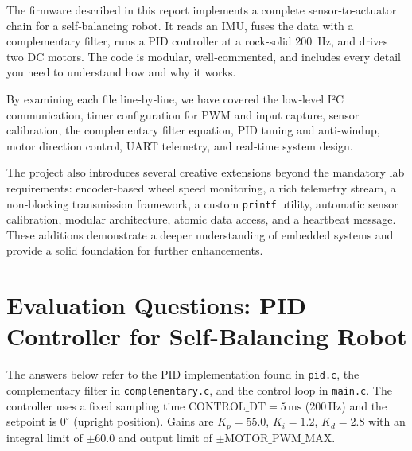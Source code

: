 \documentclass[12pt,a4paper]{article}
\begin{document}
	The firmware described in this report implements a complete sensor‑to‑actuator chain for a self‑balancing robot. It reads an IMU, fuses the data with a complementary filter, runs a PID controller at a rock‑solid \SI{200}{\hertz}, and drives two DC motors. The code is modular, well‑commented, and includes every detail you need to understand how and why it works.
	
	By examining each file line‑by‑line, we have covered the low‑level I²C communication, timer configuration for PWM and input capture, sensor calibration, the complementary filter equation, PID tuning and anti‑windup, motor direction control, UART telemetry, and real‑time system design.
	
	The project also introduces several creative extensions beyond the mandatory lab requirements: encoder‑based wheel speed monitoring, a rich telemetry stream, a non‑blocking transmission framework, a custom \texttt{printf} utility, automatic sensor calibration, modular architecture, atomic data access, and a heartbeat message. These additions demonstrate a deeper understanding of embedded systems and provide a solid foundation for further enhancements.
	
	\newpage
	\section{Evaluation Questions: PID Controller for Self-Balancing Robot}
	The answers below refer to the PID implementation found in \texttt{pid.c}, the 
	complementary filter in \texttt{complementary.c}, and the control loop in 
	\texttt{main.c}. The controller uses a fixed sampling time 
	$\text{CONTROL\_DT} = 5\,\text{ms}$ (200\,Hz) and the setpoint is $0^\circ$ 
	(upright position). Gains are $K_p=55.0$, $K_i=1.2$, $K_d=2.8$ with an 
	integral limit of $\pm 60.0$ and output limit of $\pm\text{MOTOR\_PWM\_MAX}$.
	
\end{document}
